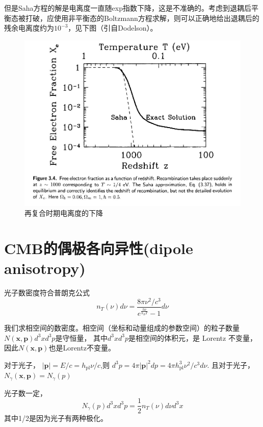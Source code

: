 \documentclass[]{ctexart}
\begin{document}
但是Saha方程的解是电离度一直随exp指数下降，这是不准确的。考虑到退耦后平衡态被打破，应使用非平衡态的Boltzmann方程求解，则可以正确地给出退耦后的残余电离度约为$10^{-3}$，见下图（引自Dodelson）。
\begin{figure}[!hbtp]
	\centering
	\includegraphics[width=1.0\linewidth]{recombination.jpg}
	\caption{再复合时期电离度的下降} 
\end{figure}


\section{CMB的偶极各向异性(dipole anisotropy)}

光子数密度符合普朗克公式
\begin{equation}
    n_T\left(\nu\right) d\nu = \frac{8\pi \nu^2 /c^3}{e^\frac{h\nu}{k_BT}-1} d\nu
\end{equation}

我们求相空间的数密度。相空间（坐标和动量组成的参数空间）的粒子数量 $N\left(\boldsymbol{x},\boldsymbol{p}\right) d^3x d^3p$是守恒量， 其中$d^3x d^3p$是相空间的体积元，是 Lorentz 不变量， 因此$N\left(\boldsymbol{x},\boldsymbol{p}\right)$也是Lorentz不变量。

对于光子， $|\boldsymbol{p}|=E/c=h_{\mathrm{pl}} \nu/c$,则 $d^3p=4\pi |\boldsymbol{p}|^2 dp=4\pi h_{\mathrm{pl}}^3 \nu^2/c^3 d\nu$. 且对于光子， $N_\gamma(\boldsymbol{x},\boldsymbol{p})=N_\gamma\left(p\right) $

光子数一定，
\begin{equation}
    N_\gamma(p)d^3x d^3p = \frac{1}{2} n_T\left(\nu\right) d\nu d^3x
\end{equation}
其中1/2是因为光子有两种极化。
\end{document}
